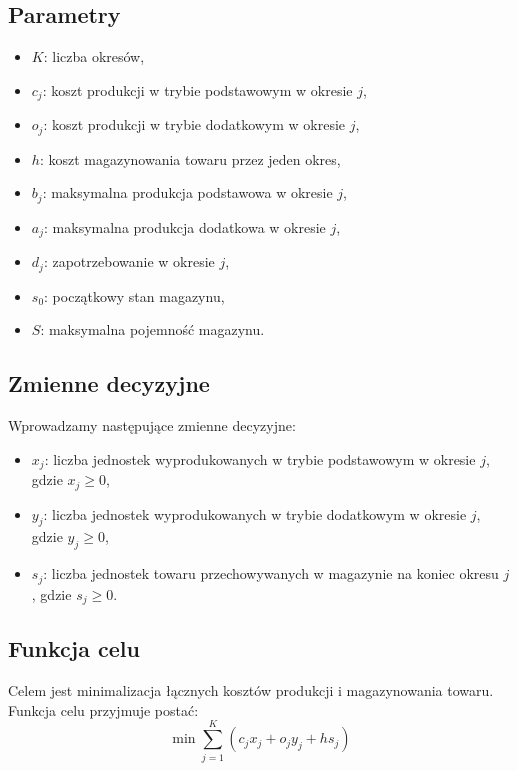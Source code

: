 \documentclass[12pt, letterpaper]{article}
\begin{document}
\subsection{Parametry}
\begin{itemize}
  \item \( K \): liczba okresów,
  \item \( c_j \): koszt produkcji w trybie podstawowym w okresie \( j \),
  \item \( o_j \): koszt produkcji w trybie dodatkowym w okresie \( j \),
  \item \( h \): koszt magazynowania towaru przez jeden okres,
  \item \( b_j \): maksymalna produkcja podstawowa w okresie \( j \),
  \item \( a_j \): maksymalna produkcja dodatkowa w okresie \( j \),
  \item \( d_j \): zapotrzebowanie w okresie \( j \),
  \item \( s_0 \): początkowy stan magazynu,
  \item \( S \): maksymalna pojemność magazynu.
\end{itemize}

\subsection{Zmienne decyzyjne}
Wprowadzamy następujące zmienne decyzyjne:
\begin{itemize}
  \item \( x_j \): liczba jednostek wyprodukowanych w trybie podstawowym w
        okresie \( j \), gdzie \( x_j \geq 0 \),
  \item \( y_j \): liczba jednostek wyprodukowanych w trybie dodatkowym w
        okresie \( j \), gdzie \( y_j \geq 0 \),
  \item \( s_j \): liczba jednostek towaru przechowywanych w magazynie na
        koniec okresu \( j \), gdzie \( s_j \geq 0 \).
\end{itemize}

\subsection{Funkcja celu}
Celem jest minimalizacja łącznych kosztów produkcji i magazynowania towaru.
Funkcja celu przyjmuje postać:
\[
  \min \sum_{j=1}^K \left( c_j x_j + o_j y_j + h s_j \right)
\]
\end{document}
